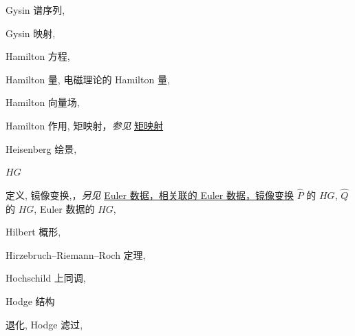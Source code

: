 \begin{theindex}
\indexspace
\item \leavevmode\hypertarget{idx:0570}{Gysin 谱序列},\enspace{}
\indexspace
\item \leavevmode\hypertarget{idx:0569}{Gysin 映射},\enspace{}
\indexspace
\item \leavevmode\hypertarget{idx:0571}{Hamilton 方程},\enspace{}
\indexspace
\item \leavevmode\hypertarget{idx:0572}{Hamilton 量},\enspace{}
\subitem \leavevmode\hypertarget{idx:0573}{电磁理论的 Hamilton 量},\enspace{}
\indexspace
\item \leavevmode\hypertarget{idx:0576}{Hamilton 向量场},\enspace{}
\indexspace
\item \leavevmode\hypertarget{idx:0574}{Hamilton 作用},\enspace{}
\subitem \leavevmode\hypertarget{idx:0575}{矩映射}，\textit{参见} \hyperlink{idx:0898}{矩映射}
\indexspace
\item \leavevmode\hypertarget{idx:0578}{Heisenberg 绘景},\enspace{}
\indexspace
\item \leavevmode\hypertarget{idx:0579}{$HG$}
\subitem \leavevmode\hypertarget{idx:0580}{定义},\enspace{}
\subitem \leavevmode\hypertarget{idx:0581}{镜像变换},\enspace{}，\textit{另见} \hyperlink{idx:0268}{Euler 数据，相关联的 Euler 数据，镜像变换}
\subitem \leavevmode\hypertarget{idx:0582}{$\widehat P$ 的 $HG$},\enspace{}
\subitem \leavevmode\hypertarget{idx:0583}{$\widehat Q$ 的 $HG$},\enspace{}
\subitem \leavevmode\hypertarget{idx:0584}{Euler 数据的 $HG$},\enspace{}
\indexspace
\item \leavevmode\hypertarget{idx:0585}{Hilbert 概形},\enspace{}
\indexspace
\item \leavevmode\hypertarget{idx:0586}{Hirzebruch--Riemann--Roch 定理},\enspace{}
\indexspace
\item \leavevmode\hypertarget{idx:0587}{Hochschild 上同调},\enspace{}
\indexspace
\item \leavevmode\hypertarget{idx:0593}{Hodge 结构}
\subitem \leavevmode\hypertarget{idx:0594}{退化},\enspace{}
\subitem \leavevmode\hypertarget{idx:0595}{Hodge 滤过},\enspace{}

\end{theindex}
